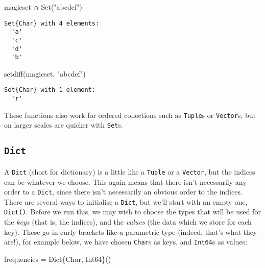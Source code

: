 \documentclass[
  letterpaper,
  DIV=11,
  numbers=noendperiod]{scrreprt}
\newenvironment{Shaded}{\begin{snugshade}}{\end{snugshade}}
\newcommand{\DataTypeTok}[1]{\textcolor[rgb]{0.68,0.00,0.00}{#1}}
\newcommand{\FunctionTok}[1]{\textcolor[rgb]{0.28,0.35,0.67}{#1}}
\newcommand{\NormalTok}[1]{\textcolor[rgb]{0.00,0.23,0.31}{#1}}
\newcommand{\OperatorTok}[1]{\textcolor[rgb]{0.37,0.37,0.37}{#1}}
\newcommand{\StringTok}[1]{\textcolor[rgb]{0.13,0.47,0.30}{#1}}
\begin{document}
\begin{Shaded}
\begin{Highlighting}[]
\NormalTok{magicset }\OperatorTok{∩} \FunctionTok{Set}\NormalTok{(}\StringTok{"abcdef"}\NormalTok{)}
\end{Highlighting}
\end{Shaded}

\begin{verbatim}
Set{Char} with 4 elements:
  'a'
  'c'
  'd'
  'b'
\end{verbatim}

\begin{Shaded}
\begin{Highlighting}[]
\FunctionTok{setdiff}\NormalTok{(magicset, }\StringTok{"abcdef"}\NormalTok{)}
\end{Highlighting}
\end{Shaded}

\begin{verbatim}
Set{Char} with 1 element:
  'r'
\end{verbatim}

These functions also work for ordered collections such as
\texttt{Tuple}s or \texttt{Vector}s, but on larger scales are quicker
with \texttt{Set}s.

\hypertarget{dict}{%
\subsection{\texorpdfstring{\texttt{Dict}}{Dict}}\label{dict}}

A \texttt{Dict} (short for dictionary) is a little like a \texttt{Tuple}
or a \texttt{Vector}, but the indices can be whatever we choose. This
again means that there isn't necessarily any order to a \texttt{Dict},
since there isn't necessarily an obvious order to the indices. There are
several ways to initialise a \texttt{Dict}, but we'll start with an
empty one, \texttt{Dict()}. Before we run this, we may wish to choose
the types that will be used for the \emph{keys} (that is, the indices),
and the \emph{values} (the data which we store for each key). These go
in curly brackets like a parametric type (indeed, that's what they
are!), for example below, we have chosen \texttt{Char}s as keys, and
\texttt{Int64}s as values:

\begin{Shaded}
\begin{Highlighting}[]
\NormalTok{frequencies }\OperatorTok{=} \FunctionTok{Dict}\DataTypeTok{\{Char, Int64\}}\NormalTok{()}
\end{Highlighting}
\end{Shaded}
\end{document}

